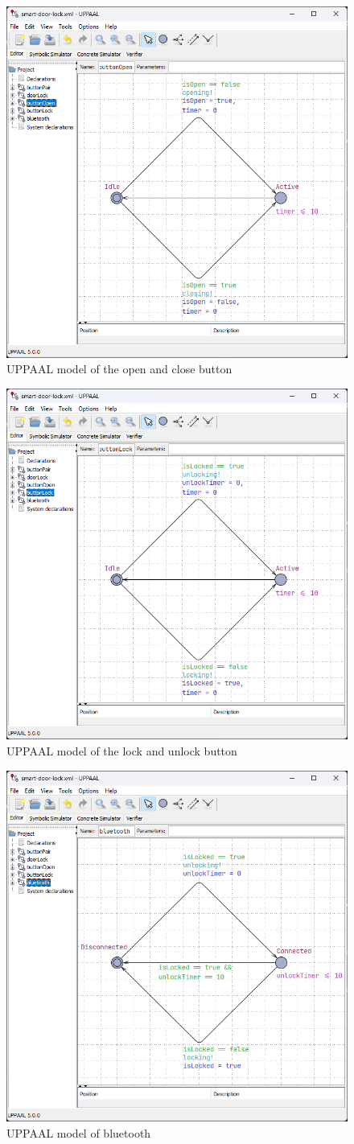 \begin{figure}[tbh]
\includegraphics[width=.45\textwidth]{./../uppaal/buttonOpen.png}
\caption{UPPAAL model of the open and close button}
\label{app:fig:UPPAALModelButtonOpen}
\end{figure}

\begin{figure}[tbh]
\includegraphics[width=.45\textwidth]{./../uppaal/buttonLock.png}
\caption{UPPAAL model of the lock and unlock button}
\label{app:fig:UPPAALModelButtonLock}
\end{figure}

\begin{figure}[tbh]
\includegraphics[width=.45\textwidth]{./../uppaal/bluetooth.png}
\caption{UPPAAL model of bluetooth}
\label{app:fig:UPPAALModelBluetooth}
\end{figure}

